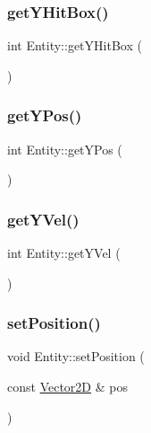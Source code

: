 \mbox{\label{class_entity_a843b664cfecb1a912f3bc385f6ef2ae2}} 
\subsubsection{\texorpdfstring{get\+Y\+Hit\+Box()}{getYHitBox()}}
{\footnotesize\ttfamily int Entity\+::get\+Y\+Hit\+Box (\begin{DoxyParamCaption}{ }\end{DoxyParamCaption})\hspace{0.3cm}{\ttfamily [inline]}}

\mbox{\label{class_entity_a84360a6824c2e29fa324eb9cc0d988e0}} 
\subsubsection{\texorpdfstring{get\+Y\+Pos()}{getYPos()}}
{\footnotesize\ttfamily int Entity\+::get\+Y\+Pos (\begin{DoxyParamCaption}{ }\end{DoxyParamCaption})\hspace{0.3cm}{\ttfamily [inline]}}

\mbox{\label{class_entity_a56464fa481c71c541c51700c5498c6b0}} 
\subsubsection{\texorpdfstring{get\+Y\+Vel()}{getYVel()}}
{\footnotesize\ttfamily int Entity\+::get\+Y\+Vel (\begin{DoxyParamCaption}{ }\end{DoxyParamCaption})\hspace{0.3cm}{\ttfamily [inline]}}

\mbox{\label{class_entity_a372b9155542c8a228a4f1305f5f67341}} 
\subsubsection{\texorpdfstring{set\+Position()}{setPosition()}}
{\footnotesize\ttfamily void Entity\+::set\+Position (\begin{DoxyParamCaption}\item[{const \hyperlink{_vector2_d_8hpp_aa1f1145650f1dd9bddf7335ec6434d7c}{Vector2D} \&}]{pos }\end{DoxyParamCaption})\hspace{0.3cm}{\ttfamily [inline]}}

